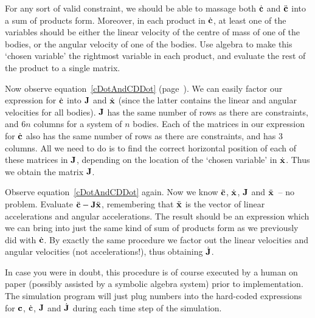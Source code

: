 For any sort of valid constraint, we should be able to massage both $\dot{\ve{c}}$ and
$\ddot{\ve{c}}$ into a sum of products form. Moreover, in each product in
$\dot{\ve{c}}$, at least one of the variables should be either the linear velocity of
the centre of mass of one of the bodies, or the angular velocity of one of the bodies.
Use algebra to make this `chosen variable' the rightmost variable in each product, and
evaluate the rest of the product to a single matrix.

Now observe equation~\ref{cDotAndCDDot} (page~\pageref{cDotAndCDDot}). We can easily
factor our expression for
$\dot{\ve{c}}$ into $\m{J}$ and $\dot{\ve{x}}$ (since the latter contains
the linear and angular velocities for all bodies). $\m{J}$ has the same number of rows
as there are constraints, and $6n$ columns for a system of $n$ bodies. Each of the matrices
in our expression for $\dot{\ve{c}}$ also has the same number of rows as there are
constraints, and has 3 columns. All we need to do is to find the correct horizontal position
of each of these matrices in $\m{J}$, depending on the location of the `chosen variable'
in $\dot{\ve{x}}$. Thus we obtain the matrix $\m{J}$.

Observe equation~\ref{cDotAndCDDot} again. Now we know $\ddot{\ve{c}}$, $\dot{\ve{x}}$,
$\m{J}$ and $\ddot{\ve{x}}$~-- no problem. Evaluate
$\ddot{\ve{c}} - \m{J}\ddot{\ve{x}}$, remembering that $\ddot{\ve{x}}$ is
the vector of linear accelerations and angular accelerations. The result should be an
expression which we can bring into just the same kind of sum of products form as we previously
did with $\dot{\ve{c}}$. By exactly the same procedure we factor out the linear velocities
and angular velocities (not accelerations!), thus obtaining $\dot{\m{J}}$.

In case you were in doubt, this procedure is of course executed by a human on paper
(possibly assisted by a symbolic algebra system) prior to
implementation. The simulation program will just plug numbers into the hard-coded expressions
for $\ve{c}$, $\dot{\ve{c}}$, $\m{J}$ and $\dot{\m{J}}$ during each time step
of the simulation.
